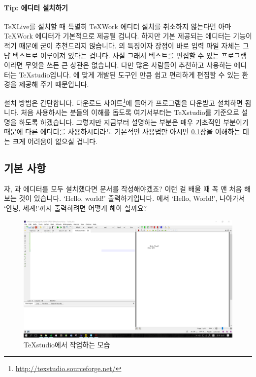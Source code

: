 \paragraph{Tip: 에디터 설치하기}
\TeX Live를 설치할 때 특별히 TeXWork 에디터 설치를 취소하지 않는다면 아마 TeXWork 에디터가 기본적으로 제공될 겁니다. 하지만 기본 제공되는 에디터는 기능이 적기 때문에 굳이 추천드리지 않습니다. \lt 의 특징이자 장점이 바로 입력 파일 자체는 그냥 텍스트로 이루어져 있다는 겁니다. 사실 그래서 텍스트를 편집할 수 있는 프로그램이라면 무엇을 쓰든 큰 상관은 없습니다. 다만 많은 사람들이 추천하고 사용하는 에디터는 TeXstudio입니다. \lt 에 맞게 개발된 도구인 만큼 쉽고 편리하게 편집할 수 있는 환경을 제공해 주기 때문입니다.

설치 방법은 간단합니다. 다운로드 사이트\footnote{\url{http://texstudio.sourceforge.net/}}에 들어가 프로그램을 다운받고 설치하면 됩니다. 처음 사용하시는 분들의 이해를 돕도록 여기서부터는 TeXstudio를 기준으로 설명을 하도록 하겠습니다. 그렇지만 지금부터 설명하는 부분은 매우 기초적인 부분이기 때문에 다른 \lt 에디터를 사용하시더라도 기본적인 사용법만 아시면 \ref{sec:basics}장을 이해하는 데는 크게 어려움이 없으실 겁니다.

\subsection{기본 사항}
\label{sec:basics}
자, \lt 과 에디터를 모두 설치했다면 문서를 작성해야겠죠? 이런 걸 배울 때 꼭 맨 처음 해보는 것이 있습니다. `Hello, world!' 출력하기입니다. \lt 에서 `Hello, World!', 나아가서 `안녕, 세계!'까지 출력하려면 어떻게 해야 할까요?

\begin{figure}[h]
	\includegraphics[width=\textwidth]{figures/nhelloworld.png}
	\caption{TeXstudio에서 작업하는 모습\label{fig:nhelloworld}}
\end{figure}

